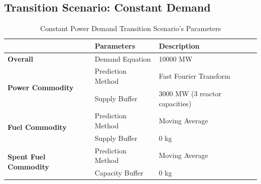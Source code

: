 \documentclass{anstrans}
\begin{document}
\subsection{\textbf{Transition Scenario: Constant Demand}}

\begin{table}[!htbp]
    \centering
    \caption {Constant Power Demand Transition Scenario's Parameters}
	\label{tab:transition-scenario-constant-power}
    \begin{tabular}{|l|l|p{4.5cm}|}
    \hline
                                     & \textbf{Parameters}    & \textbf{Description} \\ \hline
    \textbf{Overall}& Demand Equation & 10000 MW \\ \hline
    \multirow{2}{*}{\textbf{Power Commodity}} & Prediction Method      &  Fast Fourier Transform\\ \cline{2-3} 
                                     & Supply Buffer          &  3000 MW (3 reactor capacities)\\ \hline
    \multirow{2}{*}{\textbf{Fuel Commodity}}  & Prediction Method      &  Moving Average\\ \cline{2-3}
                                     & Supply Buffer & 0 kg \\ \hline
    \multirow{2}{*}{\textbf{Spent Fuel Commodity}}  & Prediction Method      &  Moving Average\\ \cline{2-3}
                                     & Capacity Buffer & 0 kg \\ \hline
    \end{tabular}
\end{table}
\end{document}
